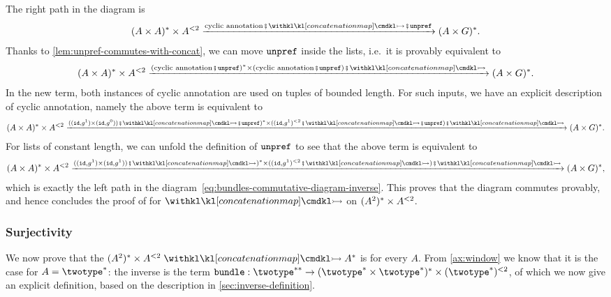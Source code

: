 The right path in the diagram is
\begin{align*}
    (A \times A)^* \times A^{<2} \xrightarrow{
        \text{cyclic annotation}\comp \concmap\comp \unprefterm}
    (A \times G)^*.
\end{align*}
Thanks to \cref{lem:unpref-commutes-with-concat}, we can move $\unprefterm$ inside the lists, i.e.~it is provably equivalent to
\begin{align*}
    (A \times A)^* \times A^{<2} \xrightarrow{
        (\text{cyclic annotation}\comp \unprefterm)^* \times (\text{cyclic annotation}\comp \unprefterm)\comp\concmap}
    (A \times G)^*.
\end{align*}
In the new term, both instances of cyclic annotation are used on tuples of bounded length. For such inputs, we have an explicit description of cyclic annotation, namely the above term is equivalent to
\begin{align*}
    (A \times A)^* \times A^{<2} \xrightarrow{
        ((\idterm,g^1) \times (\idterm,g^0))\comp\concmap\comp \unprefterm)^* \times ((\idterm,g^1)^{<2}\comp \concmap\comp \unprefterm)\comp\concmap}
    (A \times G)^*.
\end{align*}
For lists of constant length, we can unfold the definition of $\unprefterm$ to see that the above term is equivalent to
\begin{align*}
    (A \times A)^* \times A^{<2} \xrightarrow{
        ((\idterm,g^1) \times (\idterm,g^1))\comp\concmap)^* \times ((\idterm,g^1)^{<2}\comp \concmap)\comp\concmap}
    (A \times G)^*,
\end{align*}
which is exactly the left path in the diagram~\eqref{eq:bundles-commutative-diagram-inverse}. This proves that the diagram commutes provably, and hence concludes the proof of  for $\concmap$ on $\bundle[A]{2}$.

\subsubsection{Surjectivity}
\label{sec:bundle-surjectivity}

We now prove that the  $\bundle{2} \concmap A^*$ is  for every  $A$. From \cref{ax:window} we know that it is the case for $A = \twotype^*$: the inverse is the term $\bundleterm : \twotype^{**} \to (\twotype^* \times \twotype^*)^* \times (\twotype^*)^{< 2}$, of which we now give an explicit definition, based on the description in \cref{sec:inverse-definition}.

